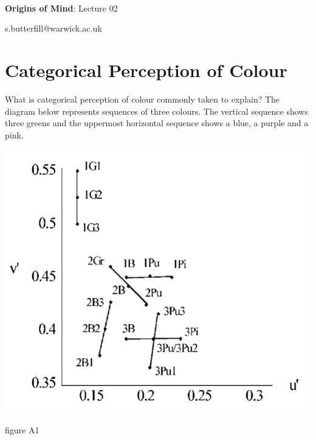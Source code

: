 \documentclass[12pt]{extarticle}
\date{}
\makeatletter
\def \ititle {Origins of Mind}
\def \isubtitle {Lecture 02}
\def \iemail{s.butterfill@warwick.ac.uk}
\makeatother
\begin{document}
\begin{multicols}{3}

\setlength\footnotesep{1em}









\def \ititle {Origins of Mind}
 
\def \isubtitle {Lecture 02}
 
 
 
\
 
 
 
\begin{center}
 
{\Large
 
\textbf{\ititle}: \isubtitle
 
}
 
 
 
\iemail %
 
\end{center}
 
 
 
\section{Categorical Perception of Colour}
 
What is categorical perception of colour commonly taken to explain?
The diagram below represents sequences of three colours.
The vertical sequence shows three greens and the uppermost horizontal sequence shows a blue, a purple and a pink.
\begin{center}
\includegraphics[scale=0.3]{daoutis_2006_fig_A1.png}
\end{center}
\begin{center} \citealp{Daoutis:2006ij} figure A1 \end{center}
 

\end{multicols}
\end{document}
